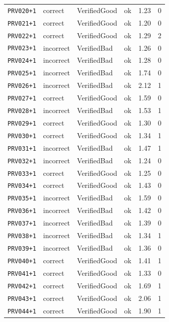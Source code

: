 \begin{longtable}{@{}l l l l r r@{}}
\texttt{PRV020{+}1} & correct & VerifiedGood & ok & 1.23 & 0 \\
\texttt{PRV021{+}1} & correct & VerifiedGood & ok & 1.20 & 0 \\
\texttt{PRV022{+}1} & correct & VerifiedGood & ok & 1.29 & 2 \\
\texttt{PRV023{+}1} & incorrect & VerifiedBad & ok & 1.26 & 0 \\
\texttt{PRV024{+}1} & incorrect & VerifiedBad & ok & 1.28 & 0 \\
\texttt{PRV025{+}1} & incorrect & VerifiedBad & ok & 1.74 & 0 \\
\texttt{PRV026{+}1} & incorrect & VerifiedBad & ok & 2.12 & 1 \\
\texttt{PRV027{+}1} & correct & VerifiedGood & ok & 1.59 & 0 \\
\texttt{PRV028{+}1} & incorrect & VerifiedBad & ok & 1.53 & 1 \\
\texttt{PRV029{+}1} & correct & VerifiedGood & ok & 1.30 & 0 \\
\texttt{PRV030{+}1} & correct & VerifiedGood & ok & 1.34 & 1 \\
\texttt{PRV031{+}1} & incorrect & VerifiedBad & ok & 1.47 & 1 \\
\texttt{PRV032{+}1} & incorrect & VerifiedBad & ok & 1.24 & 0 \\
\texttt{PRV033{+}1} & correct & VerifiedGood & ok & 1.25 & 0 \\
\texttt{PRV034{+}1} & correct & VerifiedGood & ok & 1.43 & 0 \\
\texttt{PRV035{+}1} & incorrect & VerifiedBad & ok & 1.59 & 0 \\
\texttt{PRV036{+}1} & incorrect & VerifiedBad & ok & 1.42 & 0 \\
\texttt{PRV037{+}1} & incorrect & VerifiedBad & ok & 1.39 & 0 \\
\texttt{PRV038{+}1} & incorrect & VerifiedBad & ok & 1.34 & 1 \\
\texttt{PRV039{+}1} & incorrect & VerifiedBad & ok & 1.36 & 0 \\
\texttt{PRV040{+}1} & correct & VerifiedGood & ok & 1.41 & 1 \\
\texttt{PRV041{+}1} & correct & VerifiedGood & ok & 1.33 & 0 \\
\texttt{PRV042{+}1} & correct & VerifiedGood & ok & 1.69 & 1 \\
\texttt{PRV043{+}1} & correct & VerifiedGood & ok & 2.06 & 1 \\
\texttt{PRV044{+}1} & correct & VerifiedGood & ok & 1.90 & 1 \\

\end{longtable}
